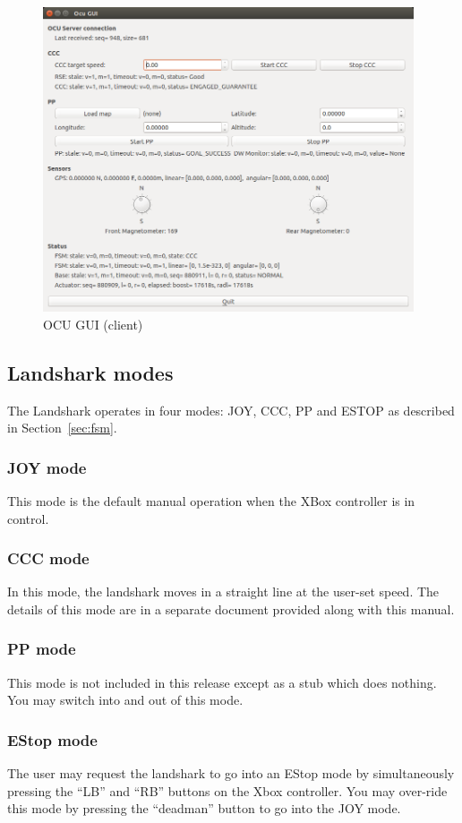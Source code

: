 \begin{figure}[htb]
\begin{center}
\includegraphics[height=90mm]{figures/ocu.png} 
\caption{OCU GUI (client)}
\label{fig:ocu}
\end{center}
\end{figure}

\subsection{Landshark modes}
The Landshark operates in four modes: JOY, CCC, PP and ESTOP as described in
Section~\ref{sec:fsm}. 

\subsubsection{JOY mode}
This mode is the default manual operation when the XBox controller is in control.

\subsubsection{CCC mode}
In this mode, the landshark moves in a straight line at the user-set speed. The details of this
mode are in a separate document provided along with this manual.

\subsubsection{PP mode}
This mode is not included in this release except as a stub which does nothing. You may switch
into and out of this mode.

\subsubsection{EStop mode}
The user may request the landshark to go into an EStop mode by simultaneously pressing the
``LB'' and ``RB'' buttons on the Xbox controller. You may over-ride this mode by pressing
the ``deadman'' button to go into the JOY mode.

